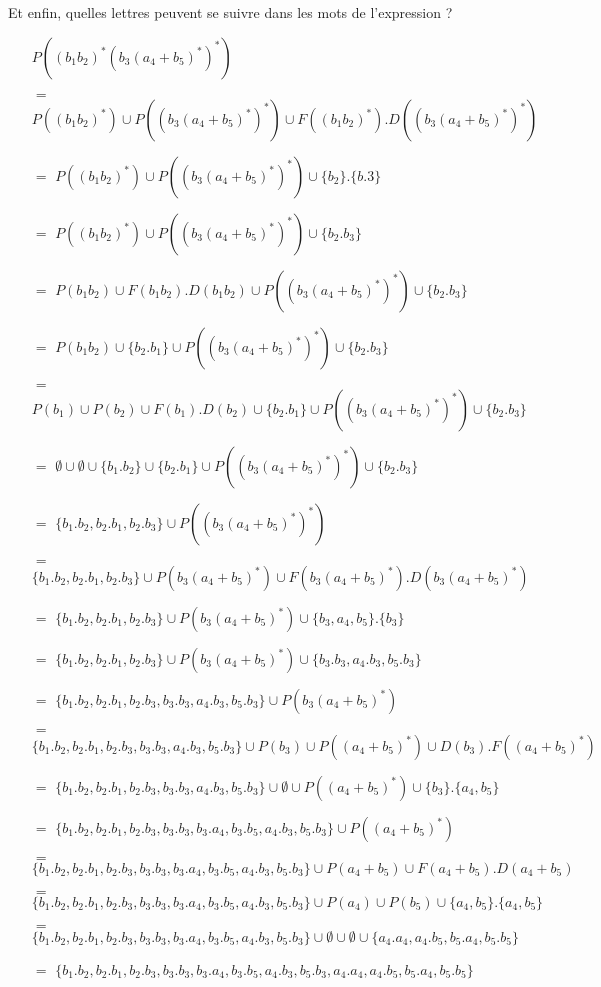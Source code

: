 \begin{correction*}
\vspace{0.3cm}Et enfin, quelles lettres peuvent se suivre dans les mots de l'expression ?\vspace{0.3cm}

\begin{itemize}
\item[] $P((b_1b_2)^*(b_3(a_4+b_5)^*)^*)$
\item[$=$] $P((b_1b_2)^*) \cup P((b_3(a_4+b_5)^*)^*) \cup F((b_1b_2)^*).D((b_3(a_4+b_5)^*)^*)$
\item[$=$] $P((b_1b_2)^*) \cup P((b_3(a_4+b_5)^*)^*) \cup \{b_2\}.\{b.3\}$
\item[$=$] $P((b_1b_2)^*) \cup P((b_3(a_4+b_5)^*)^*) \cup \{b_2.b_3\}$
\item[$=$] $P(b_1b_2) \cup F(b_1b_2).D(b_1b_2) \cup P((b_3(a_4+b_5)^*)^*) \cup \{b_2.b_3\}$
\item[$=$] $P(b_1b_2) \cup \{b_2.b_1\} \cup P((b_3(a_4+b_5)^*)^*) \cup \{b_2.b_3\}$
\item[$=$] $P(b_1) \cup P(b_2) \cup F(b_1).D(b_2) \cup \{b_2.b_1\} \cup P((b_3(a_4+b_5)^*)^*) \cup \{b_2.b_3\}$
\item[$=$] $\emptyset \cup \emptyset \cup \{b_1.b_2\} \cup \{b_2.b_1\} \cup P((b_3(a_4+b_5)^*)^*) \cup \{b_2.b_3\}$
\item[$=$] $\{b_1.b_2, b_2.b_1, b_2.b_3\} \cup P((b_3(a_4+b_5)^*)^*)$

\item[$=$] $\{b_1.b_2, b_2.b_1, b_2.b_3\} \cup P(b_3(a_4+b_5)^*) \cup F(b_3(a_4+b_5)^*).D(b_3(a_4+b_5)^*)$

\item[$=$] $\{b_1.b_2, b_2.b_1, b_2.b_3\} \cup P(b_3(a_4+b_5)^*) \cup \{b_3,a_4,b_5\}.\{b_3\}$
\item[$=$] $\{b_1.b_2, b_2.b_1, b_2.b_3\} \cup P(b_3(a_4+b_5)^*) \cup \{b_3.b_3,a_4.b_3,b_5.b_3\}$
\item[$=$] $\{b_1.b_2, b_2.b_1, b_2.b_3, b_3.b_3, a_4.b_3, b_5.b_3\} \cup P(b_3(a_4+b_5)^*)$
\item[$=$] $\{b_1.b_2, b_2.b_1, b_2.b_3, b_3.b_3, a_4.b_3, b_5.b_3\} \cup P(b_3) \cup P((a_4+b_5)^*) \cup D(b_3).F((a_4+b_5)^*)$
\item[$=$] $\{b_1.b_2, b_2.b_1, b_2.b_3, b_3.b_3, a_4.b_3, b_5.b_3\} \cup \emptyset \cup P((a_4+b_5)^*) \cup \{b_3\}.\{a_4,b_5\}$
\item[$=$] $\{b_1.b_2, b_2.b_1, b_2.b_3, b_3.b_3, b_3.a_4, b_3.b_5, a_4.b_3, b_5.b_3\} \cup P((a_4+b_5)^*)$
\item[$=$] $\{b_1.b_2, b_2.b_1, b_2.b_3, b_3.b_3, b_3.a_4, b_3.b_5, a_4.b_3, b_5.b_3\} \cup P(a_4+b_5) \cup F(a_4+b_5).D(a_4+b_5)$
\item[$=$] $\{b_1.b_2, b_2.b_1, b_2.b_3, b_3.b_3, b_3.a_4, b_3.b_5, a_4.b_3, b_5.b_3\} \cup P(a_4) \cup P(b_5) \cup \{a_4,b_5\}.\{a_4,b_5\}$
\item[$=$] $\{b_1.b_2, b_2.b_1, b_2.b_3, b_3.b_3, b_3.a_4, b_3.b_5, a_4.b_3, b_5.b_3\} \cup \emptyset \cup \emptyset \cup \{a_4.a_4,a_4.b_5,b_5.a_4,b_5.b_5\}$
\item[$=$] $\{b_1.b_2, b_2.b_1, b_2.b_3, b_3.b_3, b_3.a_4, b_3.b_5, a_4.b_3, b_5.b_3,a_4.a_4,a_4.b_5,b_5.a_4,b_5.b_5\}$
\end{itemize}


\end{correction*}
